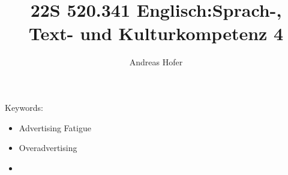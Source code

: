 \documentclass{article}
\title{22S 520.341 Englisch:Sprach-, Text- und Kulturkompetenz 4}
\author{Andreas Hofer}
\begin{document}
	\maketitle
	Keywords:
	\begin{itemize}
		\item{Advertising Fatigue}
		\item{Overadvertising}
		\item{}
	\end{itemize}
	
\end{document}
